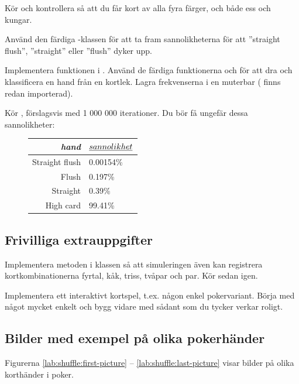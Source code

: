 \Subtask Kör  och kontrollera så att du får kort av alla fyra färger, och både ess och kungar.

\Task Använd den färdiga -klassen för att ta fram sannolikheterna för att  ''straight flush'', ''straight'' eller ''flush'' dyker upp.

\Subtask Implementera funktionen  i . Använd de färdiga funktionerna  och  för att dra och klassificera en hand från en kortlek. Lagra frekvenserna i en muterbar  ( finns redan importerad).

\Subtask Kör , förslagsvis med 1 000 000 iterationer. Du bör få ungefär dessa sannolikheter:
\begin{figure}[H]\centering
\begin{tabular}{r|l}
\emph{hand} & $\emph{sannolikhet}$ \\ \hline
Straight flush & 0.00154\%  \\
Flush          & 0.197\%    \\
Straight       & 0.39\%     \\
High card      & 99.41\%
\end{tabular}
\end{figure}


\subsection{Frivilliga extrauppgifter}

\Task Implementera metoden  i klassen  så att simuleringen även kan registrera kortkombinationerna fyrtal, kåk, triss, tvåpar och par. Kör sedan  igen.


\Task Implementera ett interaktivt kortspel, t.ex. någon enkel pokervariant. Börja med något mycket enkelt och bygg vidare med sådant som du tycker verkar roligt.



\subsection{Bilder med exempel på olika pokerhänder}\label{shuffle:hands}

Figurerna \ref{lab:shuffle:first-picture} -- \ref{lab:shuffle:last-picture} visar bilder på olika korthänder i poker.

